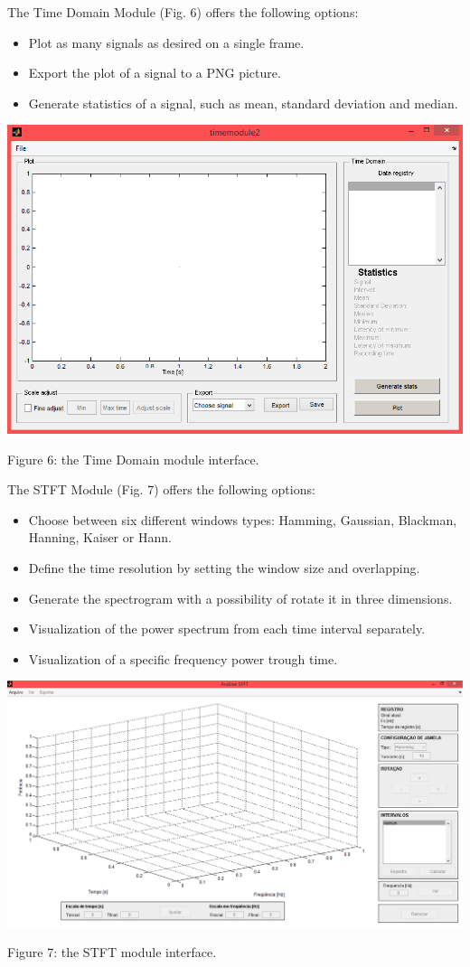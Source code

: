 \documentclass[12pt, a4paper]{article}
\begin{document}
The Time Domain Module (Fig. 6) offers the following options:
\begin{itemize}
\item Plot as many signals as desired on a single frame.
\item Export the plot of a signal to a PNG picture.
\item Generate statistics of a signal, such as mean, standard deviation and median.
\end{itemize}
\begin{center}
\includegraphics[width=15cm]{timedomain.png}

Figure 6: the Time Domain module interface.
\end{center}

The STFT Module (Fig. 7) offers the following options:
\begin{itemize}
\item Choose between six different windows types: Hamming, Gaussian, Blackman, Hanning, Kaiser or Hann.
\item Define the time resolution by setting the window size and overlapping.
\item Generate the spectrogram with a possibility of rotate it in three dimensions.
\item Visualization of the power spectrum from each time interval separately.
\item Visualization of a specific frequency power trough time.
\end{itemize}
\begin{center}
\includegraphics[width=15cm]{stft1.png}

Figure 7: the STFT module interface.
\end{center}
\end{document}
